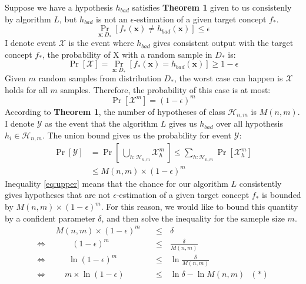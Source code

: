 \documentclass[a4paper,12pt]{article}
\begin{document}
Suppose we have a hypothesis $h_{bad}$ satisfies \textbf{Theorem 1} given to us consistenly by algorithm $L$, but $h_{bad}$ is not an $\epsilon$-estimation of a given target concept $f_*$.
\begin{equation*}
    \Pr_{\boldsymbol{x}:D_*} [f_*(\boldsymbol{x}) \neq h_{bad}(\boldsymbol{x})] \leq \epsilon
\end{equation*}
I denote event $\mathcal{X}$ is the event where $h_{bad}$ gives consistent output with the target concept $f_*$, the probability of X with a random sample in $D_*$ is:
\begin{equation*}
    \Pr[\mathcal{X}] = \Pr_{\boldsymbol{x}:D_*} [f_*(\boldsymbol{x}) = h_{bad}(\boldsymbol{x})] \geq 1 - \epsilon
\end{equation*}
Given $m$ random samples from distribution $D_*$, the worst case can happen is $\mathcal{X}$ holds for all $m$ samples. Therefore, the probability of this case is at most:
\begin{equation*}
    \Pr[\mathcal{X}^m] = (1 - \epsilon)^m
\end{equation*}
According to \textbf{Theorem 1}, the number of hypotheses of class $\mathcal{H}_{n,m}$ is $M(n,m)$. I denote $\mathcal{Y}$ as the event that the algorithm $L$ gives us $h_{bad}$ over all hypothesis $h_i \in \mathcal{H}_{n,m}$. The union bound gives us the probability for event $\mathcal{Y}$:
\begin{equation} \label{eq:upper}
    \begin{aligned}
        \Pr[\mathcal{Y}] & = \Pr \left [\ \bigcup_{h:\mathcal{H}_{n,m}}\mathcal{X}^m_h\ \right ]
        \leq \sum_{h:\mathcal{H}_{n,m}} \Pr[\mathcal{X}^{m}_h] \\
        & \leq M(n,m) \times (1-\epsilon)^m
    \end{aligned}
\end{equation}
\noindent
Inequality \eqref{eq:upper} means that the chance for our algorithm $L$ consistently gives hypotheses that are not $\epsilon$-estimation of a given target concept $f_*$ is bounded by $M(n,m) \times (1-\epsilon)^m$. For this reason, we would like to bound this quantity by a confident parameter $\delta$, and then solve the inequality for the sameple size $m$.
\begin{equation*}
    \begin{aligned}
        & M(n,m) \times (1-\epsilon)^m && \leq \ \ \ \delta \\
        \Leftrightarrow \ \ &\ \ \ \ \ \ \ \ \ (1-\epsilon)^m && \leq \ \ \ \frac{\delta}{M(n,m)}\\
        \Leftrightarrow \ \ &\ \ \ \ \ \ \ \ln(1-\epsilon)^m && \leq \ \ \ \ln\frac{\delta}{M(n,m)}\\
        \Leftrightarrow \ \ &\ \ \ \ \ m \times \ln(1-\epsilon) && \leq \ \ \ \ln \delta - \ln M(n,m) \ \ \ (\boldsymbol{\ast})
    \end{aligned}
\end{equation*}
\end{document}
